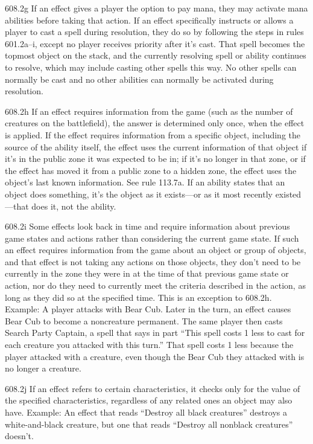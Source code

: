 608.2g If an effect gives a player the option to pay mana, they may activate mana abilities before taking that action. If an effect specifically instructs or allows a player to cast a spell during resolution, they do so by following the steps in rules 601.2a–i, except no player receives priority after it’s cast. That spell becomes the topmost object on the stack, and the currently resolving spell or ability continues to resolve, which may include casting other spells this way. No other spells can normally be cast and no other abilities can normally be activated during resolution.

608.2h If an effect requires information from the game (such as the number of creatures on the battlefield), the answer is determined only once, when the effect is applied. If the effect requires information from a specific object, including the source of the ability itself, the effect uses the current information of that object if it’s in the public zone it was expected to be in; if it’s no longer in that zone, or if the effect has moved it from a public zone to a hidden zone, the effect uses the object’s last known information. See rule 113.7a. If an ability states that an object does something, it’s the object as it exists—or as it most recently existed—that does it, not the ability.

608.2i Some effects look back in time and require information about previous game states and actions rather than considering the current game state. If such an effect requires information from the game about an object or group of objects, and that effect is not taking any actions on those objects, they don’t need to be currently in the zone they were in at the time of that previous game state or action, nor do they need to currently meet the criteria described in the action, as long as they did so at the specified time. This is an exception to 608.2h.
Example: A player attacks with Bear Cub. Later in the turn, an effect causes Bear Cub to become a noncreature permanent. The same player then casts Search Party Captain, a spell that says in part “This spell costs {1} less to cast for each creature you attacked with this turn.” That spell costs {1} less because the player attacked with a creature, even though the Bear Cub they attacked with is no longer a creature.

608.2j If an effect refers to certain characteristics, it checks only for the value of the specified characteristics, regardless of any related ones an object may also have.
Example: An effect that reads “Destroy all black creatures” destroys a white-and-black creature, but one that reads “Destroy all nonblack creatures” doesn’t.

